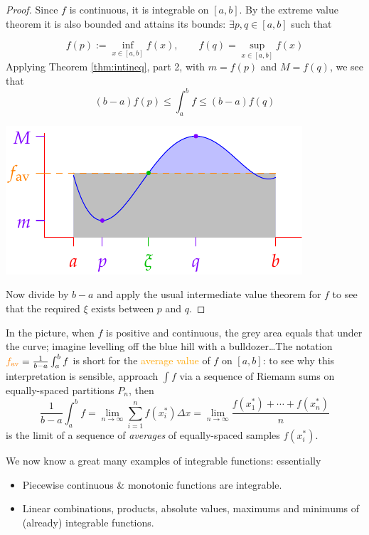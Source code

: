 \begin{proof}%
Since $f$ is continuous, it is integrable on $[a,b]$. By the extreme value theorem it is also bounded and attains its bounds: $\exists p,q\in[a,b]$ such that\par
\begin{minipage}[t]{0.55\linewidth}\vspace{-5pt}
\[f(p):=\inf\limits_{x\in[a,b]}f(x),\qquad f(q)=\sup\limits_{x\in[a,b]}f(x)\]
Applying Theorem \ref{thm:intineq}, part 2, with $m=f(p)$ and $M=f(q)$, we see that
\[(b-a)f(p)\le\int_a^bf\le (b-a)f(q)\]
\end{minipage}\begin{minipage}[t]{0.45\linewidth}\vspace{-5pt}
\flushright\includegraphics{average}
\end{minipage}\bigbreak

Now divide by $b-a$ and apply the usual intermediate value theorem for $f$ to see that the required $\xi$ exists between $p$ and $q$.
\end{proof}

In the picture, when $f$ is positive and continuous, the grey area equals that under the curve; imagine levelling off the blue hill with a bulldozer\ldots The notation $\textcolor{orange}{f_{\text{av}}}=\frac 1{b-a}\int_a^bf$ is short for the \textcolor{orange}{average value} of $f$ on $[a,b]$: to see why this interpretation is sensible, approach $\int f$ via a sequence of Riemann sums on equally-spaced partitions $P_n$, then
\[\frac 1{b-a}\int_a^b f =\lim_{n\to\infty}\sum_{i=1}^nf(x_i^*)\Delta x=\lim_{n\to\infty}\frac{f(x_1^*)+\cdots+f(x_n^*)}n\]
is the limit of a sequence of \emph{averages} of equally-spaced samples $f(x_i^*)$.

\goodbreak


We now know a great many examples of integrable functions: essentially
\begin{itemize}\itemsep0pt
  \item Piecewise continuous \& monotonic functions are integrable.
  \item Linear combinations, products, absolute values, maximums and minimums of (already) integrable functions.
\end{itemize}

